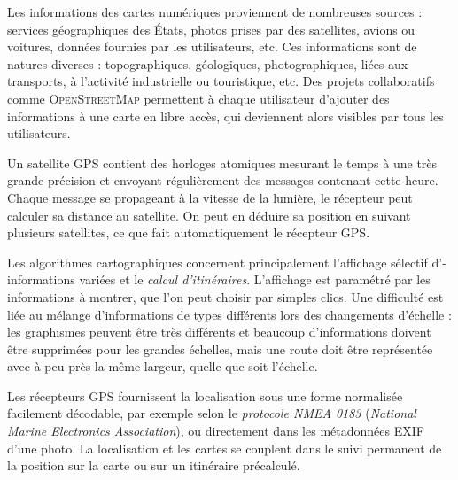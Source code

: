 \begin{tcolorbox}[title={Données et information}, toprule=0pt, leftrule=0pt, rightrule=0pt, arc=0pt,
                  fonttitle=\scshape\boxtitlefont,
                  colbacktitle=white, coltitle=firstcolor, colframe=firstcolor, colback=firstcolor!10,
                  breakable, enhanced jigsaw]
Les informations des cartes numériques proviennent de nombreuses sources : services géographiques des États, photos prises par des satellites, avions ou voitures, données fournies par les utilisateurs, etc. Ces informations sont de natures diverses : topographiques, géologiques, photographiques, liées aux transports, à l’activité industrielle ou touristique, etc. Des projets collaboratifs comme \textsc{OpenStreetMap} permettent à chaque utilisateur d’ajouter des informations à une carte en libre accès, qui deviennent alors visibles par tous les utilisateurs.

Un satellite GPS contient des horloges atomiques mesurant le temps à une très grande précision et envoyant régulièrement des messages contenant cette heure. Chaque message se propageant à la vitesse de la lumière, le récepteur peut calculer sa distance au satellite. On peut en déduire sa position en suivant plusieurs satellites, ce que fait automatiquement le récepteur GPS.
\end{tcolorbox}

\begin{tcolorbox}[title={Algorithmes et programmes}, toprule=0pt, leftrule=0pt, rightrule=0pt, arc=0pt,
                  fonttitle=\scshape\boxtitlefont,
                  colbacktitle=white, coltitle=firstcolor, colframe=firstcolor, colback=firstcolor!10,
                  breakable, enhanced jigsaw]
Les algorithmes cartographiques concernent principalement l’affichage sélectif d’­­­­­informations variées et le \emph{calcul d’itinéraires}. L’affichage est paramétré par les informations à montrer, que l’on peut choisir par simples clics. Une difficulté est liée au mélange d’informations de types différents lors des changements d’échelle : les graphismes peuvent être très différents et beaucoup d’informations doivent être supprimées pour les grandes échelles, mais une route doit être représentée avec à peu près la même largeur, quelle que soit l’échelle.

Les récepteurs GPS fournissent la localisation sous une forme normalisée facilement décodable, par exemple selon le \emph{protocole NMEA 0183} (\textit{National Marine Electronics Association}), ou directement dans les métadonnées EXIF d’une photo. La localisation et les cartes se couplent dans le suivi permanent de la position sur la carte ou sur un itinéraire précalculé.
\end{tcolorbox}


